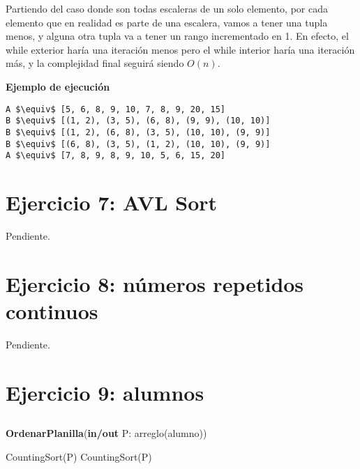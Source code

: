 Partiendo del caso donde son todas escaleras de un solo elemento, por cada elemento que en realidad es parte de una escalera, vamos a tener una tupla menos, y alguna otra tupla va a tener un rango incrementado en 1. En efecto, el while exterior haría una iteración menos pero el while interior haría una iteración más, y la complejidad final seguirá siendo $O(n)$.

\textbf{Ejemplo de ejecución}

\begin{lstlisting}
A $\equiv$ [5, 6, 8, 9, 10, 7, 8, 9, 20, 15]
B $\equiv$ [(1, 2), (3, 5), (6, 8), (9, 9), (10, 10)]
B $\equiv$ [(1, 2), (6, 8), (3, 5), (10, 10), (9, 9)]
B $\equiv$ [(6, 8), (3, 5), (1, 2), (10, 10), (9, 9)]
A $\equiv$ [7, 8, 9, 8, 9, 10, 5, 6, 15, 20]
\end{lstlisting}

\section{Ejercicio 7: AVL Sort}

Pendiente.

\section{Ejercicio 8: números repetidos continuos}

Pendiente.

\section{Ejercicio 9: alumnos}

\subsection{}

\begin{algorithm}[H]
\caption{
    \textbf{OrdenarPlanilla}(\textbf{in/out} P: arreglo(alumno))
}
\begin{algorithmic}[1]
    \State CountingSort(P) 
    \State CountingSort(P) 
\end{algorithmic}
\end{algorithm}

\subsection{}

